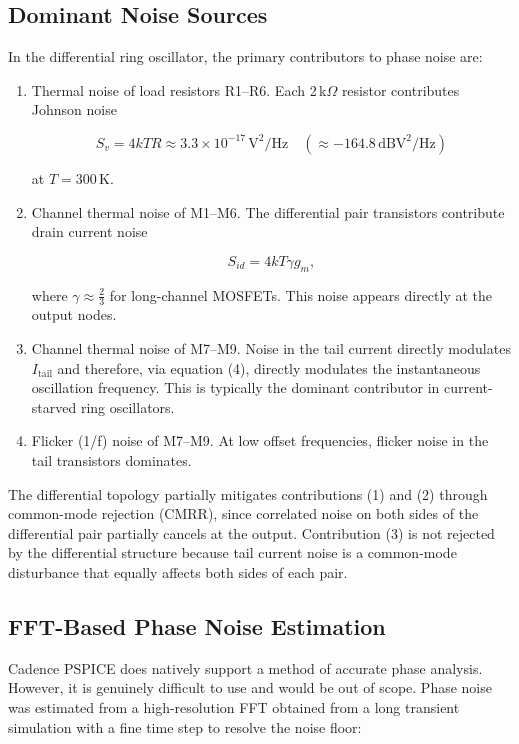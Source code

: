 \documentclass[11pt]{article}
\begin{document}
\subsection{Dominant Noise Sources}

In the differential ring oscillator, the primary contributors to phase noise are:

\begin{enumerate}
    \item Thermal noise of load resistors R1--R6. Each 2\,k\(\Omega\) resistor contributes
    Johnson noise
    

\[
    S_v = 4 k T R \approx 3.3 \times 10^{-17} \, \text{V}^2/\text{Hz}
    \quad (\approx -164.8 \, \text{dBV}^2/\text{Hz})
    \]


    at $T = 300\,$K.

    \item Channel thermal noise of M1--M6. The differential pair transistors contribute
    drain current noise
    

\[
    S_{id} = 4 k T \gamma g_m,
    \]


    where $\gamma \approx \tfrac{2}{3}$ for long-channel MOSFETs. This noise appears
    directly at the output nodes.

    \item Channel thermal noise of M7--M9. Noise in the tail current directly modulates
    $I_{\text{tail}}$ and therefore, via equation (4), directly modulates the instantaneous
    oscillation frequency. This is typically the dominant contributor in current-starved
    ring oscillators.

    \item Flicker (1/f) noise of M7--M9. At low offset frequencies, flicker noise in the
    tail transistors dominates.
\end{enumerate}

The differential topology partially mitigates contributions (1) and (2) through common-mode
rejection (CMRR), since correlated noise on both sides of the differential pair partially
cancels at the output. Contribution (3) is not rejected by the differential structure because
tail current noise is a common-mode disturbance that equally affects both sides of each pair.


\subsection{FFT-Based Phase Noise Estimation}

Cadence PSPICE does natively support a method of accurate phase analysis. However, it is genuinely difficult to use and would be out of scope. Phase noise was estimated
from a high-resolution FFT obtained from a long transient simulation with a fine time
step to resolve the noise floor:
\end{document}
